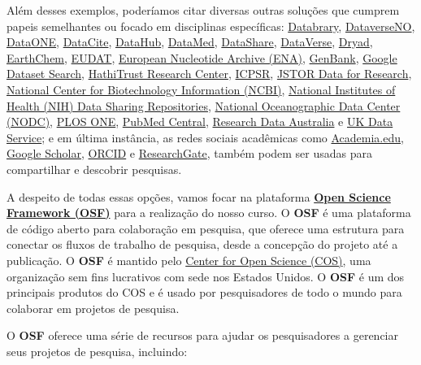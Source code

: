 \documentclass[
  a4paper,
]{book}
\begin{document}
Além desses exemplos, poderíamos citar diversas outras soluções que
cumprem papeis semelhantes ou focado em disciplinas específicas:
\href{https://databrary.org}{Databrary},
\href{https://dataverse.no}{DataverseNO},
\href{https://dataone.org}{DataONE},
\href{https://datacite.org}{DataCite},
\href{https://datahub.io}{DataHub}, \href{https://datamed.org}{DataMed},
\href{https://datashare.is.ed.ac.uk}{DataShare},
\href{https://dataverse.org}{DataVerse},
\href{https://datadryad.org}{Dryad},
\href{https://earthchem.org}{EarthChem}, \href{https://eudat.eu}{EUDAT},
\href{https://www.ebi.ac.uk/ena/browser/home}{European Nucleotide
Archive (ENA)}, \href{https://ncbi.nlm.nih.gov/genbank}{GenBank},
\href{https://datasetsearch.research.google.com}{Google Dataset Search},
\href{https://hathitrust.org}{HathiTrust Research Center},
\href{https://icpsr.umich.edu}{ICPSR}, \href{https://jstor.org}{JSTOR
Data for Research}, \href{https://ncbi.nlm.nih.gov}{National Center for
Biotechnology Information (NCBI)}, \href{https://nih.gov}{National
Institutes of Health (NIH) Data Sharing Repositories},
\href{https://data.noaa.gov}{National Oceanographic Data Center (NODC)},
\href{https://plos.org}{PLOS ONE},
\href{https://ncbi.nlm.nih.gov/pmc}{PubMed Central},
\href{http://researchdata.ands.org.au}{Research Data Australia} e
\href{https://ukdataservice.ac.uk}{UK Data Service}; e em última
instância, as redes sociais acadêmicas como
\href{https://academia.edu}{Academia.edu},
\href{https://scholar.google.com}{Google Scholar},
\href{https://orcid.org}{ORCID} e
\href{https://researchgate.net}{ResearchGate}, também podem ser usadas
para compartilhar e descobrir pesquisas.

A despeito de todas essas opções, vamos focar na plataforma
\href{https://osf.io/}{\textbf{Open Science Framework (OSF)}} para a
realização do nosso curso. O \textbf{OSF} é uma plataforma de código
aberto para colaboração em pesquisa, que oferece uma estrutura para
conectar os fluxos de trabalho de pesquisa, desde a concepção do projeto
até a publicação. O \textbf{OSF} é mantido pelo
\href{https://www.cos.io/}{Center for Open Science (COS)}, uma
organização sem fins lucrativos com sede nos Estados Unidos. O
\textbf{OSF} é um dos principais produtos do COS e é usado por
pesquisadores de todo o mundo para colaborar em projetos de pesquisa.

O \textbf{OSF} oferece uma série de recursos para ajudar os
pesquisadores a gerenciar seus projetos de pesquisa, incluindo:
\end{document}
